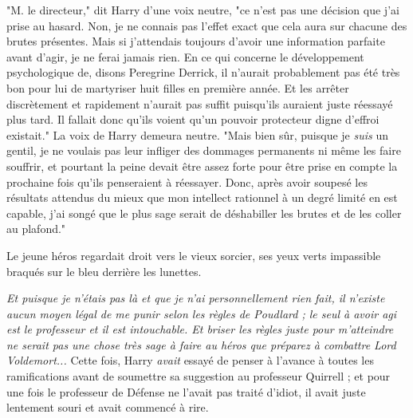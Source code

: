 "M. le directeur," dit Harry d'une voix neutre, "ce n'est pas une décision que j'ai prise au hasard. Non, je ne connais pas l'effet exact que cela aura sur chacune des brutes présentes. Mais si j'attendais toujours d'avoir une information parfaite avant d'agir, je ne ferai jamais rien. En ce qui concerne le développement psychologique de, disons Peregrine Derrick, il n'aurait probablement pas été très bon pour lui de martyriser huit filles en première année. Et les arrêter discrètement et rapidement n'aurait pas suffit puisqu'ils auraient juste réessayé plus tard. Il fallait donc qu'ils voient qu'un pouvoir protecteur digne d'effroi existait." La voix de Harry demeura neutre. "Mais bien sûr, puisque je \emph{suis}  un gentil, je ne voulais pas leur infliger des dommages permanents ni même les faire souffrir, et pourtant la peine devait être assez forte pour être prise en compte la prochaine fois qu'ils penseraient à réessayer. Donc, après avoir soupesé les résultats attendus du mieux que mon intellect rationnel à un degré limité en est capable, j'ai songé que le plus sage serait de déshabiller les brutes et de les coller au plafond."

Le jeune héros regardait droit vers le vieux sorcier, ses yeux verts impassible braqués sur le bleu derrière les lunettes.

\emph{Et puisque je n'étais pas là et que je n'ai personnellement rien fait, il n'existe aucun moyen légal de me punir selon les règles de Poudlard ; le seul à avoir agi est le professeur et il est intouchable. Et briser les règles juste pour m'atteindre ne serait pas une chose très sage à faire au héros que préparez à combattre Lord Voldemort...}  Cette fois, Harry \emph{avait}  essayé de penser à l'avance à toutes les ramifications avant de soumettre sa suggestion au professeur Quirrell ; et pour une fois le professeur de Défense ne l'avait pas traité d'idiot, il avait juste lentement souri et avait commencé à rire.

